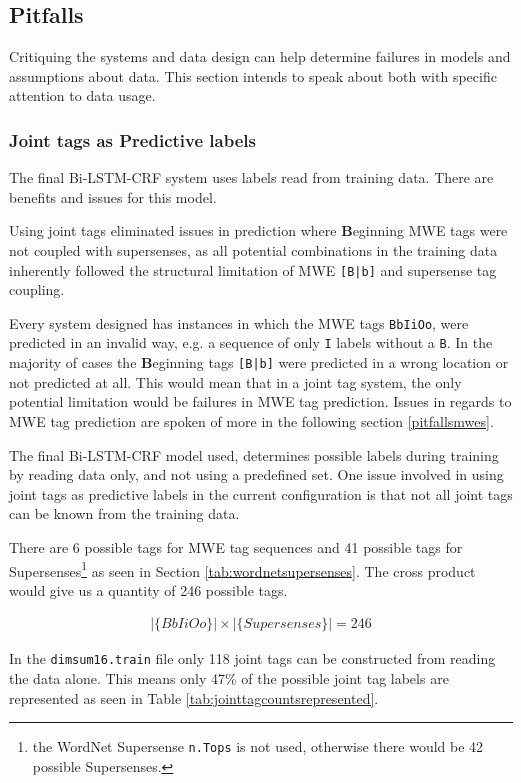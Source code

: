 \subsection{Pitfalls}\label{chapter5discussionpitfalls}

Critiquing the systems and data design can help determine failures in models and assumptions about data. This section intends to speak about both with specific attention to data usage.

\subsubsection{Joint tags as Predictive labels}
The final Bi-LSTM-CRF system uses labels read from training data. There are benefits and issues for this model. 

Using joint tags eliminated issues in prediction where {\bf B}eginning MWE tags were not coupled with supersenses, as all potential combinations in the training data inherently followed the structural limitation of MWE \texttt{[B|b]} and supersense tag coupling.

Every system designed has instances in which the MWE tags \texttt{{BbIiOo}}, were predicted in an invalid way, e.g. a sequence of only \texttt{I} labels without a \texttt{B}. In the majority of cases the {\bf B}eginning tags \texttt{[B|b]} were predicted in a wrong location or not predicted at all. This would mean that in a joint tag system, the only potential limitation would be failures in MWE tag prediction. Issues in regards to MWE tag prediction are spoken of more in the following section \ref{pitfallsmwes}.

The final Bi-LSTM-CRF model used, determines possible labels during training by reading data only, and not using a predefined set. One issue involved in using joint tags as predictive labels in the current configuration is that not all joint tags can be known from the training data. 

There are 6 possible tags for MWE tag sequences and 41 possible tags for Supersenses\footnote{the WordNet Supersense \texttt{n.Tops} is not used, otherwise there would be 42 possible Supersenses.} as seen in Section \ref{tab:wordnetsupersenses}. The cross product would give us a quantity of 246 possible tags. 

\begin{align*}
   |\{BbIiOo\}| \times |\{Supersenses\}| = 246
\end{align*}

In the \texttt{dimsum16.train} file only 118 joint tags can be constructed from reading the data alone. This means only 47\% of the possible joint tag labels are represented as seen in Table \ref{tab:jointtagcountsrepresented}.

